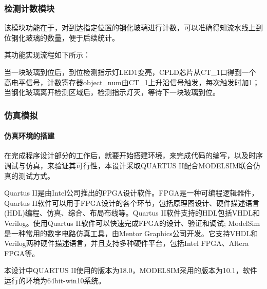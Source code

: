   
    \subsubsection{检测计数模块}
    
    该模块功能在于，对到达指定位置的钢化玻璃进行计数，可以准确得知流水线上到位钢化玻璃的数量，便于后续统计。\par
    其功能实现流程如下所示：\par
    当一块玻璃到位后，到位检测指示灯LED1变亮，CPLD芯片从CT\_1口得到一个高电平信号，计数寄存器object\_num由CT\_1上升沿信号触发，每次触发时加1；当钢化玻璃离开检测区域后，检测指示灯灭，等待下一块玻璃到位。\par
    \subsubsection{仿真模拟}
    \paragraph{仿真环境的搭建}
    在完成程序设计部分的工作后，就要开始搭建环境，来完成代码的编写，以及时序调试与仿真，来验证其可行性，本设计采取QUARTUS II配合MODELSIM联合仿真的测试方式。\par
    Quartus II是由Intel公司推出的FPGA设计软件。FPGA是一种可编程逻辑器件，Quartus II软件可以用于FPGA设计的各个环节，包括原理图设计、硬件描述语言(HDL)编程、仿真、综合、布局布线等。Quartus II软件支持的HDL包括VHDL和Verilog。使用Quartus II软件可以快速完成FPGA的设计、验证和调试;
    ModelSim是一种常用的数字电路仿真工具，由Mentor Graphics公司开发。它支持VHDL和Verilog两种硬件描述语言，并且支持多种硬件平台，包括Intel FPGA、Altera FPGA等。\par
    本设计中QUARTUS II使用的版本为18.0，MODELSIM采用的版本为10.1，软件运行的环境为64bit-win10系统。\par
